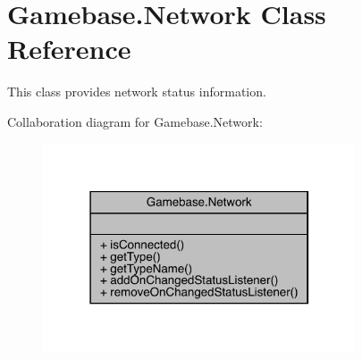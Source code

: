 \hypertarget{classcom_1_1toast_1_1android_1_1gamebase_1_1_gamebase_1_1_network}{}\section{Gamebase.\+Network Class Reference}
\label{classcom_1_1toast_1_1android_1_1gamebase_1_1_gamebase_1_1_network}


This class provides network status information.  




Collaboration diagram for Gamebase.\+Network\+:\nopagebreak
\begin{figure}[H]
\begin{center}
\leavevmode
\includegraphics[width=262pt]{classcom_1_1toast_1_1android_1_1gamebase_1_1_gamebase_1_1_network__coll__graph}
\end{center}
\end{figure}
